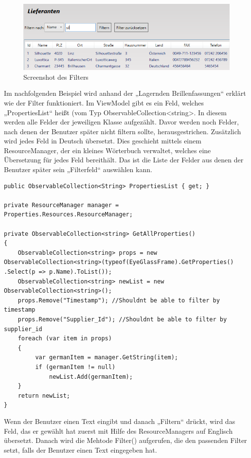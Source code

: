\begin{figure}[H]
\begin{center}
	\includegraphics[scale=0.75]{images/filter.png}
\end{center}
	\caption{Screenshot des Filters}
	\label{fig:sample}
\end{figure}
Im nachfolgenden Beispiel wird anhand der „Lagernden Brillenfassungen“ erklärt wie der Filter funktioniert. 
Im ViewModel gibt es ein Feld, welches „PropertiesList“ heißt (vom Typ ObservableCollection<string>. In diesem werden alle Felder der jeweiligen Klasse aufgezählt. Davor werden noch Felder, nach denen der Benutzer später nicht filtern sollte, herausgestrichen. Zusätzlich wird jedes Feld in Deutsch übersetzt. Dies geschieht mittels einem ResourceManager, der ein kleines Wörterbuch verwaltet, welches eine Übersetzung für jedes Feld bereithält. Das ist die Liste der Felder aus denen der Benutzer später sein „Filterfeld“ auswählen kann. 
\begin{lstlisting}
public ObservableCollection<String> PropertiesList { get; }

private ResourceManager manager = Properties.Resources.ResourceManager;

private ObservableCollection<string> GetAllProperties()
{
	ObservableCollection<string> props = new 							ObservableCollection<string>(typeof(EyeGlassFrame).GetProperties()
.Select(p => p.Name).ToList());
	ObservableCollection<string> newList = new ObservableCollection<string>();
	props.Remove("Timestamp"); //Shouldnt be able to filter by timestamp
    props.Remove("Supplier_Id"); //Shouldnt be able to filter by supplier_id
    foreach (var item in props)
    {
         var germanItem = manager.GetString(item);
         if (germanItem != null)
             newList.Add(germanItem);
    }
    return newList;
}
\end{lstlisting}
Wenn der Benutzer einen Text eingibt und danach „Filtern“ drückt, wird das Feld, das er gewählt hat zuerst mit Hilfe des ResourceManagers auf Englisch übersetzt.  Danach wird die Mehtode Filter() aufgerufen, die den passenden Filter setzt, falls der Benutzer einen Text eingegeben hat.
